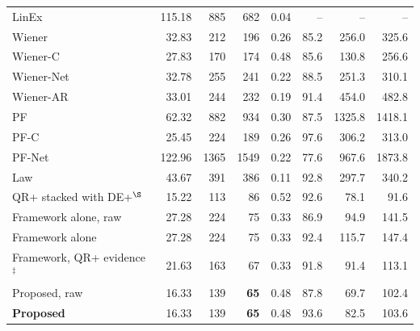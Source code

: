 \begin{table}[!tbp]
\begin{tabular}{lrrrrrrr}
LinEx & 115.18 & 885 & 682 & 0.04 & -- & -- & --\\
Wiener & 32.83 & 212 & 196 & 0.26 & 85.2 & 256.0 & 325.6\\
Wiener-C & 27.83 & 170 & 174 & 0.48 & 85.6 & 130.8 & 256.6\\
Wiener-Net & 32.78 & 255 & 241 & 0.22 & 88.5 & 251.3 & 310.1\\
Wiener-AR & 33.01 & 244 & 232 & 0.19 & 91.4 & 454.0 & 482.8\\
PF & 62.32 & 882 & 934 & 0.30 & 87.5 & 1325.8 & 1418.1\\
PF-C & 25.45 & 224 & 189 & 0.26 & 97.6 & 306.2 & 313.0\\
PF-Net & 122.96 & 1365 & 1549 & 0.22 & 77.6 & 967.6 & 1873.8\\
Law & 43.67 & 391 & 386 & 0.11 & 92.8 & 297.7 & 340.2\\
QR+ stacked with DE+$^\S$ & 15.22 & 113 & 86 & 0.52 & 92.6 & 78.1 & 91.6\\
Framework alone, raw & 27.28 & 224 & 75 & 0.33 & 86.9 & 94.9 & 141.5\\
Framework alone & 27.28 & 224 & 75 & 0.33 & 92.4 & 115.7 & 147.4\\
Framework, QR+ evidence$^\ddagger$ & 21.63 & 163 & 67 & 0.33 & 91.8 & 91.4 & 113.1\\
Proposed, raw & 16.33 & 139 & \textbf{65} & 0.48 & 87.8 & 69.7 & 102.4\\
\textbf{Proposed} & 16.33 & 139 & \textbf{65} & 0.48 & 93.6 & 82.5 & 103.6\\
\bottomrule
\end{tabular}
\end{table}